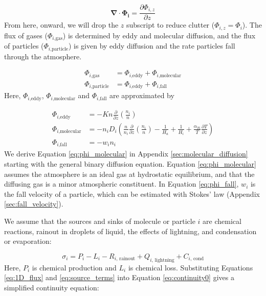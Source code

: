\documentclass{article}
\begin{document}
\begin{equation} \label{eq:1D_flux}
  \bm{\nabla} \cdot \bm{\Phi_{i}} = \frac{\partial \Phi_{i,z}}{\partial z}
\end{equation}
From here, onward, we will drop the $z$ subscript to reduce clutter ($\Phi_{i,z} = \Phi_{i}$). The flux of gases ($\Phi_{i\text{,gas}}$) is determined by eddy and molecular diffusion, and the flux of particles ($\Phi_{i\text{,particle}}$) is given by eddy diffusion and the rate particles fall through the atmosphere.

\begin{align}
  \Phi_{i\text{,gas}} &= \Phi_{i\text{,eddy}} + \Phi_{i\text{,molecular}} \label{eq:phi_gas} \\
  \Phi_{i\text{,particle}} &= \Phi_{i\text{,eddy}} + \Phi_{i\text{,fall}} \label{eq:phi_particle}
\end{align}
Here, $\Phi_{i\text{,eddy}}$, $\Phi_{i\text{,molecular}}$ and $\Phi_{i\text{,fall}}$ are approximated by

\begin{align}
  \Phi_{i\text{,eddy}} &= - Kn\frac{\partial}{\partial z}\left( \frac{n_{i}}{n} \right) \label{eq:phi_eddy}\\ 
  \Phi_{i\text{,molecular}} &= -n_i D_{i} \left( \frac{n}{n_i} \frac{\partial}{\partial z} \left(\frac{n_i}{n}\right) - \frac{1}{H_a} + \frac{1}{H_i} + \frac{\alpha_{Ti}}{T} \frac{\partial T}{\partial z} \right) \label{eq:phi_molecular} \\
  \Phi_{i\text{,fall}} &= - w_i n_i \label{eq:phi_fall}
\end{align}
We derive Equation \eqref{eq:phi_molecular} in Appendix \ref{sec:molecular_diffusion} starting with the general binary diffusion equation. Equation \eqref{eq:phi_molecular} assumes the atmosphere is an ideal gas at hydrostatic equilibrium, and that the diffusing gas is a minor atmospheric constituent. In Equation \eqref{eq:phi_fall}, $w_i$ is the fall velocity of a particle, which can be estimated with Stokes' law (Appendix \ref{sec:fall_velocity}).

We assume that the sources and sinks of molecule or particle $i$ are chemical reactions, rainout in droplets of liquid, the effects of lightning, and condensation or evaporation:

\begin{equation} \label{eq:source_terms}
  \sigma_i = P_{i} - L_{i} - R_{i\text{, rainout}} + Q_{i\text{, lightning}} + C_{i\text{, cond}}
\end{equation}
Here, $P_{i}$ is chemical production and $L_i$ is chemical loss. Substituting Equations \eqref{eq:1D_flux} and \eqref{eq:source_terms} into Equation \eqref{eq:continuity0} gives a simplified continuity equation:
\end{document}
